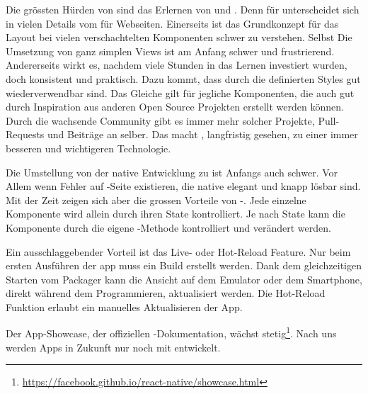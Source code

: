 Die grössten Hürden von  sind das Erlernen von und . 
Denn  für  unterscheidet sich in vielen Details vom  für Webseiten. 
Einerseits ist das Grundkonzept für das Layout bei vielen verschachtelten Komponenten schwer zu verstehen. 
Selbst Die Umsetzung von ganz simplen Views ist am Anfang schwer und frustrierend. 
Andererseits wirkt es, nachdem viele Stunden in das Lernen investiert wurden, doch konsistent und praktisch. 
Dazu kommt, dass durch  die definierten Styles gut wiederverwendbar sind. 
Das Gleiche gilt für jegliche Komponenten, die auch gut durch Inspiration aus anderen Open Source Projekten erstellt werden können.
Durch die wachsende Community gibt es immer mehr solcher Projekte, Pull-Requests und Beiträge an  selber. 
Das macht , langfristig gesehen, zu einer immer besseren und wichtigeren Technologie. 

Die Umstellung von der native Entwicklung zu  ist Anfangs auch schwer. 
Vor Allem wenn Fehler auf -Seite existieren, die native elegant und knapp lösbar sind. 
Mit der Zeit zeigen sich aber die grossen Vorteile von -. 
Jede einzelne Komponente wird allein durch ihren State kontrolliert. 
Je nach State kann die Komponente durch die eigene -Methode kontrolliert und verändert werden. 

Ein ausschlaggebender Vorteil ist das Live- oder Hot-Reload Feature. 
Nur beim ersten Ausführen der app muss ein Build erstellt werden.
Dank dem gleichzeitigen Starten vom \gls{Packager} kann die Ansicht auf dem Emulator oder dem Smartphone, direkt während dem Programmieren, aktualisiert werden. 
Die Hot-Reload Funktion erlaubt ein manuelles Aktualisieren der App. 

Der App-Showcase, der offiziellen -Dokumentation, wächst stetig\footnote{\url{https://facebook.github.io/react-native/showcase.html}}.\cite{react-native-showcase} 
Nach uns werden Apps in Zukunft nur noch mit  entwickelt.
